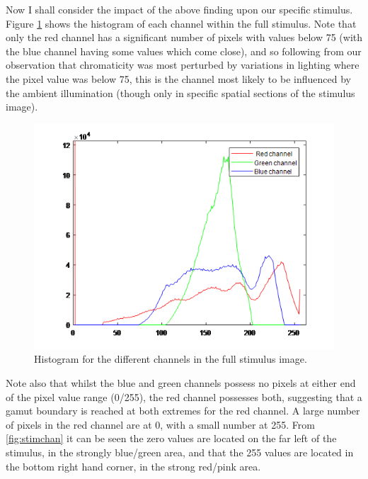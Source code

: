 

Now I shall consider the impact of the above finding upon our specific stimulus. Figure \ref{fig:stimhist} shows the histogram of each channel within the full stimulus. Note that only the red channel has a significant number of pixels with values below 75 (with the blue channel having some values which come close), and so following from our observation that chromaticity was most perturbed by variations in lighting where the pixel value was below 75, this is the channel most likely to be influenced by the ambient illumination (though only in specific spatial sections of the stimulus image).

\begin{figure}[hbtp]
\includegraphics[max width=\textwidth]{figs/tablet/stimhist.png}
\caption{Histogram for the different channels in the full stimulus image.} %
\label{fig:stimhist}
\end{figure}

Note also that whilst the blue and green channels possess no pixels at either end of the pixel value range (0/255), the red channel possesses both, suggesting that a gamut boundary is reached at both extremes for the red channel. A large number of pixels in the red channel are at 0, with a small number at 255. From \ref{fig:stimchan} it can be seen the zero values are located on the far left of the stimulus, in the strongly blue/green area, and that the 255 values are located in the bottom right hand corner, in the strong red/pink area.

